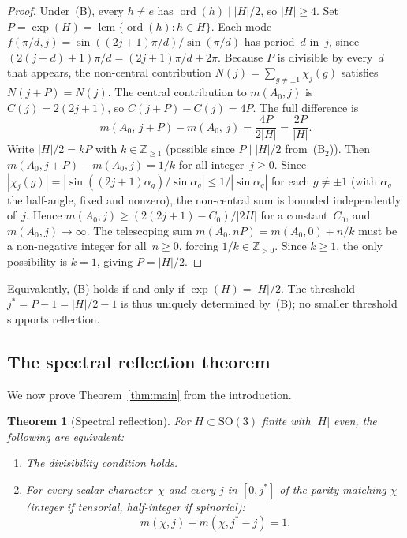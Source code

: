 \documentclass[12pt]{article}
\newtheorem{theorem}{Theorem}[section]
\theoremstyle{definition}
\theoremstyle{remark}
\newcommand{\ZZ}{\mathbb{Z}}
\newcommand{\SO}{\mathrm{SO}}
\DeclareMathOperator{\ord}{ord}
\DeclareMathOperator{\lcm}{lcm}
\begin{document}
\begin{proof}
  Under~(B), every $h \neq e$ has
  $\ord(h) \mid |H|/2$, so $|H| \ge 4$.
  Set $P = \exp(H) = \lcm\{\ord(h) : h \in H\}$.
  Each mode $f(\pi/d, j) = \sin((2j{+}1)\pi/d)/\sin(\pi/d)$
  has period~$d$ in~$j$, since
  $(2(j{+}d){+}1)\pi/d = (2j{+}1)\pi/d + 2\pi$.
  Because $P$ is divisible by every~$d$ that appears, the
  non-central contribution
  $N(j) = \sum_{g \neq \pm 1} \chi_j(g)$
  satisfies $N(j{+}P) = N(j)$.
  The central contribution to $m(A_0, j)$ is
  $C(j) = 2(2j{+}1)$, so $C(j{+}P) - C(j) = 4P$.
  The full difference is
  \[
    m(A_0,\, j{+}P) - m(A_0,\, j)
    = \frac{4P}{2|H|}
    = \frac{2P}{|H|}.
  \]
  Write $|H|/2 = kP$ with $k \in \ZZ_{\ge 1}$
  (possible since $P \mid |H|/2$ from~(B$_2$)).
  Then $m(A_0, j{+}P) - m(A_0, j) = 1/k$ for all
  integer~$j \ge 0$.
  Since $|\chi_j(g)| = |\sin((2j{+}1)\alpha_g)/\sin\alpha_g|
  \le 1/|\sin\alpha_g|$ for each $g \neq \pm 1$
  (with $\alpha_g$ the half-angle, fixed and nonzero),
  the non-central sum is bounded independently of~$j$.
  Hence $m(A_0, j) \ge (2(2j{+}1) - C_0)/|2H|$ for
  a constant~$C_0$, and $m(A_0, j) \to \infty$.
  The telescoping sum
  $m(A_0, nP) = m(A_0, 0) + n/k$ must be a
  non-negative integer for all~$n \ge 0$, forcing
  $1/k \in \ZZ_{>0}$.
  Since $k \ge 1$, the only possibility is $k = 1$,
  giving $P = |H|/2$.
\end{proof}

\noindent
Equivalently, (B) holds if and only if $\exp(H) = |H|/2$.
The threshold $j^* = P - 1 = |H|/2 - 1$ is thus uniquely
determined by~(B); no smaller threshold supports reflection.

\subsection{The spectral reflection theorem}
\label{sec:duality-theorem}

We now prove Theorem~\ref{thm:main} from the introduction.

\begin{theorem}[Spectral reflection]
  \label{thm:duality}
  For $H \subset \SO(3)$ finite with $|H|$ even, the
  following are equivalent:
  \begin{enumerate}
    \item[\textup{(B)}] The divisibility condition holds.
    \item[\textup{(C)}] For every scalar character~$\chi$
      and every $j$ in $[0, j^*]$ of the parity matching
      $\chi$
      \textup{(}integer if tensorial, half-integer if
      spinorial\textup{)}:
      \begin{equation}
        \label{eq:duality}
        m(\chi, j) + m(\chi, j^* - j) = 1.
      \end{equation}
  \end{enumerate}
\end{theorem}
\end{document}
